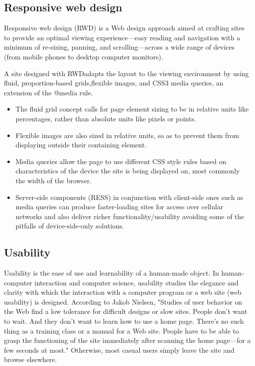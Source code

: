 \subsection {Responsive web design}
	Responsive web design (RWD)\cite{ wiki:RWD, CSS3} is a Web design approach aimed at crafting sites to provide an optimal viewing experience—easy reading and navigation with a minimum of re-sizing, panning, and scrolling—across a wide range of devices (from mobile phones to desktop computer monitors).

	A site designed with RWD\cite{pettit, ethan}adapts the layout to the viewing environment by using fluid, proportion-based grids,flexible images, and CSS3 media queries, an extension of the @media rule.
    \begin{itemize}
	\item The fluid grid concept calls for page element sizing to be in relative units like percentages, rather than absolute units like pixels or points. 
	\item Flexible images are also sized in relative units, so as to prevent them from displaying outside their containing element. 
	\item Media queries allow the page to use different CSS style rules based on characteristics of the device the site is being displayed on, most commonly the width of the browser. 
	\item Server-side components (RESS) in conjunction with client-side ones such as media queries can produce faster-loading sites for access over cellular networks and also deliver richer functionality/usability avoiding some of the pitfalls of device-side-only solutions.
	\end{itemize}

\subsection {Usability}
     Usability is the ease of use and learnability of a human-made object. In human-computer interaction and computer science, usability studies the elegance and clarity with which the interaction with a computer program or a web site (web usability) is designed.
	 According to Jakob Nielsen, "Studies of user behavior on the Web find a low tolerance for difficult designs or slow sites. People don't want to wait. And they don't want to learn how to use a home page. There's no such thing as a training class or a manual for a Web site. People have to be able to grasp the functioning of the site immediately after scanning the home page—for a few seconds at most."\cite{wiki:usability} Otherwise, most casual users simply leave the site and browse elsewhere.

